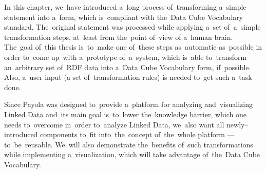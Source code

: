 In this chapter, we~have introduced a~long process of~transforming a~simple statement into
a~form, which is~compliant with the~Data Cube Vocabulary standard. The~original statement
was processed while applying a~set of~a~simple transformation steps, at~least from the~point of~view
of a~human brain. The~goal of~this thesis is~to~make one of~these steps as~automatic as~possible 
in order to~come up~with a~prototype of~a~system, which is~able to~transform an~arbitrary set of~RDF data
into a~Data Cube Vocabulary form, if~possible. Also, a~user input (a set of~transformation rules) is
needed to~get such a~task done. 

Since Payola was designed to~provide a~platform for analyzing and~visualizing 
Linked Data and~its main goal is~to~lower the~knowledge barrier, which one needs to~overcome in~order to~analyze Linked Data, we~also want all newly--introduced 
components to~fit into~the~concept of~the~whole platform --- to~be~reusable. We~will also demonstrate the~benefits of~such transformations while implementing 
a~visualization, which will take advantage of~the~Data Cube Vocabulary.
